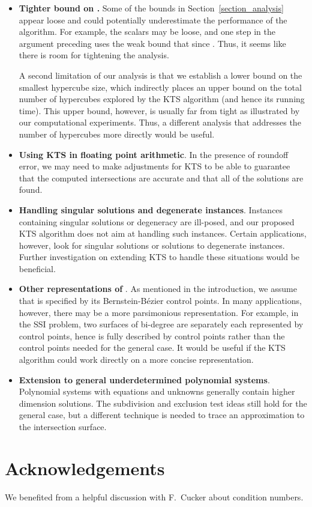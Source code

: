 \documentclass{article}
\newcommand\eref[1]{}
\begin{document}
\begin{itemize}
\item \textbf{Tighter bound on .}
Some of the bounds in Section~\ref{section_analysis} appear
loose and could potentially underestimate the performance
of the algorithm.  For example, the scalars may be loose,
and one step in the argument preceding \eref{eq:rbdcase1}
uses the weak bound that  since .  Thus, it
seems like there is room for tightening the analysis.  

A second
limitation of our analysis is that we establish a lower bound on
the smallest hypercube size, which indirectly places an upper bound on
the total number of hypercubes explored by the KTS algorithm (and hence its
running time).  This
upper bound, however, is usually far from tight as illustrated by
our computational experiments.  Thus, a different analysis that
addresses the number of hypercubes more directly would be useful.

\item \textbf{Using KTS in floating point arithmetic}. In the
presence of roundoff error, we may need to make adjustments for
KTS to be able to guarantee that the computed intersections are
accurate and that all of the solutions are found.

\item \textbf{Handling singular solutions and degenerate instances}.  Instances containing singular solutions or degeneracy are ill-posed, and our proposed KTS algorithm does not aim at handling such instances.  Certain applications, however, look for singular solutions or solutions to degenerate instances.  Further investigation on extending KTS to handle these situations would be beneficial.

\item \textbf{Other representations of }.  As mentioned in the introduction, we
assume that  is specified  by its  
Bernstein-B\'ezier control
points.  In many applications, however, there may be a more parsimonious representation.
For example, in the SSI problem, two surfaces of bi-degree 
are separately each represented by
 control points, hence  is fully described
by  control points rather than the
 control points needed for the general case.
It would be useful if the KTS algorithm could work 
directly on a more concise representation.


\item \textbf{Extension to general underdetermined polynomial systems}.  Polynomial systems with  equations and  unknowns generally contain higher dimension solutions.  The subdivision and exclusion test ideas still hold for the general case, but a different technique is needed to trace an approximation to the intersection surface. 


\end{itemize}

\section{Acknowledgements}
We benefited from a helpful discussion with F.~Cucker about
condition numbers.


\end{document}
